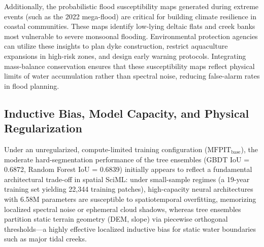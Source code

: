 \documentclass[journal]{IEEEtran}
\begin{document}
Additionally, the probabilistic flood susceptibility maps generated during extreme events (such as the 2022 mega-flood) are critical for building climate resilience in coastal communities. These maps identify low-lying deltaic flats and creek banks most vulnerable to severe monsoonal flooding. Environmental protection agencies can utilize these insights to plan dyke construction, restrict aquaculture expansions in high-risk zones, and design early warning protocols. Integrating mass-balance conservation ensures that these susceptibility maps reflect physical limits of water accumulation rather than spectral noise, reducing false-alarm rates in flood planning.

\subsection{Inductive Bias, Model Capacity, and Physical Regularization}
Under an unregularized, compute-limited training configuration ($\text{MFPIT}_{\text{base}}$), the moderate hard-segmentation performance of the tree ensembles (GBDT IoU = 0.6872, Random Forest IoU = 0.6839) initially appears to reflect a fundamental architectural trade-off in spatial SciML: under small-sample regimes (a 19-year training set yielding 22,344 training patches), high-capacity neural architectures with 6.58M parameters are susceptible to spatiotemporal overfitting, memorizing localized spectral noise or ephemeral cloud shadows, whereas tree ensembles partition static terrain geometry (DEM, slope) via piecewise orthogonal thresholds---a highly effective localized inductive bias for static water boundaries such as major tidal creeks.
\end{document}
